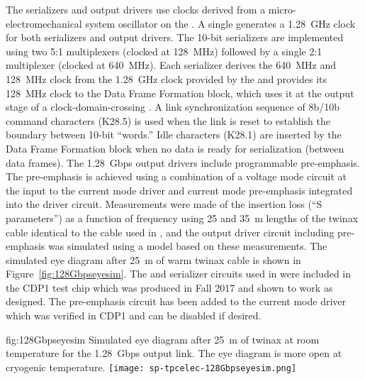The serializers and output drivers use clocks derived from a micro-electromechanical
system oscillator on the . A single  generates a 
\SI{1.28}{GHz} clock for both serializers and output drivers. The \num{10}-bit
serializers are implemented using two \num{5}:\num{1} multiplexers (clocked at \SI{128}{MHz}) 
followed by a single \num{2}:\num{1} multiplexer (clocked at \SI{640}{MHz}). Each serializer 
derives the \SI{640}{MHz} and \SI{128}{MHz} clock from the \SI{1.28}{GHz} 
clock provided by the  and provides its \SI{128}{MHz} clock to 
the Data Frame Formation block, which uses it at the output stage of a 
clock-domain-crossing . A link synchronization sequence of 8b/10b 
command characters (K28.5) is used when the link is reset to establish the 
boundary between \num{10}-bit ``words.'' Idle characters (K28.1) are inserted 
by the Data Frame Formation block when no data is ready for serialization 
(between data frames). The \SI{1.28}{Gbps} output drivers include programmable 
pre-emphasis. The pre-emphasis is achieved using a combination of a voltage 
mode circuit at the input to the current mode driver and current mode 
pre-emphasis integrated into the driver circuit. Measurements were made 
of the insertion loss (``S parameters'') as a function of frequency using
\num{25} and \SI{35}{m} lengths of the twinax cable identical to the 
cable used in , and the output driver circuit including 
pre-emphasis was simulated using a  model based on these 
measurements. The simulated eye diagram after \SI{25}{m} of warm twinax 
cable is shown in Figure~\ref{fig:128Gbpseyesim}. The  and 
serializer circuits used in  were included in the CDP1 
test chip which was produced in Fall 2017 and shown to work as designed. 
The pre-emphasis circuit has been added to the current mode driver which 
was verified in CDP1 and can be disabled if desired. 

\begin{dunefigure}
{fig:128Gbpseyesim}
{Simulated eye diagram after \SI{25}{m} of  twinax at room 
temperature for the  \SI{1.28}{Gbps} output link.  
The eye diagram is more open at cryogenic temperature.}
\texttt{[image: sp-tpcelec-128Gbpseyesim.png]}
\end{dunefigure}

